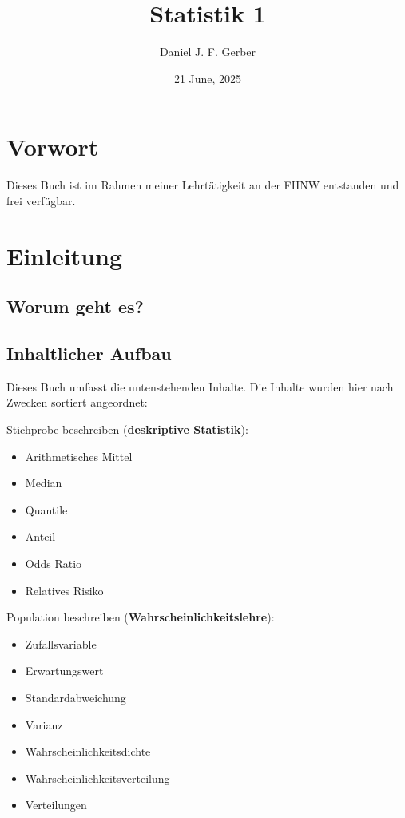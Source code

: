 \documentclass[
]{book}
\title{Statistik 1}
\author{Daniel J. F. Gerber}
\date{21 June, 2025}
\providecommand{\tightlist}{%
  \setlength{\itemsep}{0pt}\setlength{\parskip}{0pt}}
\theoremstyle{definition}
\theoremstyle{definition}
\theoremstyle{definition}
\theoremstyle{definition}
\theoremstyle{remark}
\begin{document}
\maketitle

{
\setcounter{tocdepth}{1}
\tableofcontents
}
\chapter*{Vorwort}\label{vorwort}

Dieses Buch ist im Rahmen meiner Lehrtätigkeit an der FHNW entstanden und frei verfügbar.

\chapter{Einleitung}\label{einleitung}

\section{Worum geht es?}\label{worum-geht-es}

\section{Inhaltlicher Aufbau}\label{inhaltlicher-aufbau}

Dieses Buch umfasst die untenstehenden Inhalte. Die Inhalte wurden hier nach Zwecken sortiert angeordnet:

Stichprobe beschreiben (\textbf{deskriptive Statistik}):

\begin{itemize}
\tightlist
\item
  Arithmetisches Mittel
\item
  Median
\item
  Quantile
\item
  Anteil
\item
  Odds Ratio
\item
  Relatives Risiko
\end{itemize}

Population beschreiben (\textbf{Wahrscheinlichkeitslehre}):

\begin{itemize}
\tightlist
\item
  Zufallsvariable
\item
  Erwartungswert
\item
  Standardabweichung
\item
  Varianz
\item
  Wahrscheinlichkeitsdichte
\item
  Wahrscheinlichkeitsverteilung
\item
  Verteilungen
\end{itemize}
\end{document}

